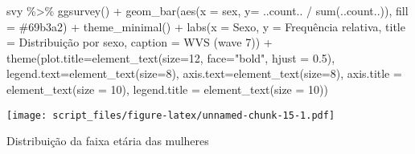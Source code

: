 \documentclass[
]{article}
\newenvironment{Shaded}{\begin{snugshade}}{\end{snugshade}}
\newcommand{\AttributeTok}[1]{\textcolor[rgb]{0.77,0.63,0.00}{#1}}
\newcommand{\DecValTok}[1]{\textcolor[rgb]{0.00,0.00,0.81}{#1}}
\newcommand{\FloatTok}[1]{\textcolor[rgb]{0.00,0.00,0.81}{#1}}
\newcommand{\FunctionTok}[1]{\textcolor[rgb]{0.00,0.00,0.00}{#1}}
\newcommand{\NormalTok}[1]{#1}
\newcommand{\SpecialCharTok}[1]{\textcolor[rgb]{0.00,0.00,0.00}{#1}}
\newcommand{\StringTok}[1]{\textcolor[rgb]{0.31,0.60,0.02}{#1}}
\begin{document}
\begin{Shaded}
\begin{Highlighting}[]
\NormalTok{svy }\SpecialCharTok{\%\textgreater{}\%}
  \FunctionTok{ggsurvey}\NormalTok{() }\SpecialCharTok{+}
  \FunctionTok{geom\_bar}\NormalTok{(}\FunctionTok{aes}\NormalTok{(}\AttributeTok{x =}\NormalTok{ sex, }\AttributeTok{y=}\NormalTok{ ..count.. }\SpecialCharTok{/} \FunctionTok{sum}\NormalTok{(..count..)), }\AttributeTok{fill =} \StringTok{\textquotesingle{}\#69b3a2\textquotesingle{}}\NormalTok{) }\SpecialCharTok{+}
  \FunctionTok{theme\_minimal}\NormalTok{() }\SpecialCharTok{+}
  \FunctionTok{labs}\NormalTok{(}\AttributeTok{x =} \StringTok{\textquotesingle{}Sexo\textquotesingle{}}\NormalTok{,}
       \AttributeTok{y =} \StringTok{\textquotesingle{}Frequência relativa\textquotesingle{}}\NormalTok{,}
       \AttributeTok{title =} \StringTok{\textquotesingle{}Distribuição por sexo\textquotesingle{}}\NormalTok{,}
       \AttributeTok{caption =} \StringTok{\textquotesingle{}WVS (wave 7)\textquotesingle{}}\NormalTok{) }\SpecialCharTok{+}
  \FunctionTok{theme}\NormalTok{(}\AttributeTok{plot.title=}\FunctionTok{element\_text}\NormalTok{(}\AttributeTok{size=}\DecValTok{12}\NormalTok{, }\AttributeTok{face=}\StringTok{"bold"}\NormalTok{, }\AttributeTok{hjust =} \FloatTok{0.5}\NormalTok{),}
        \AttributeTok{legend.text=}\FunctionTok{element\_text}\NormalTok{(}\AttributeTok{size=}\DecValTok{8}\NormalTok{),}
        \AttributeTok{axis.text=}\FunctionTok{element\_text}\NormalTok{(}\AttributeTok{size=}\DecValTok{8}\NormalTok{),}
        \AttributeTok{axis.title =} \FunctionTok{element\_text}\NormalTok{(}\AttributeTok{size =} \DecValTok{10}\NormalTok{),}
        \AttributeTok{legend.title =} \FunctionTok{element\_text}\NormalTok{(}\AttributeTok{size =} \DecValTok{10}\NormalTok{))}
\end{Highlighting}
\end{Shaded}

\texttt{[image: script\_files/figure-latex/unnamed-chunk-15-1.pdf]}

Distribuição da faixa etária das mulheres
\end{document}

